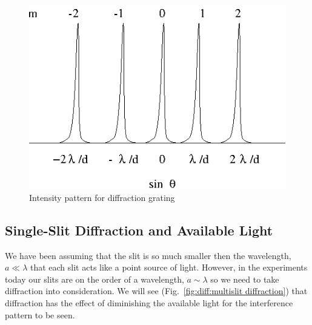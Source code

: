 \begin{figure}[htb]
\centering 
\epsfxsize=6cm \includegraphics[scale=0.6]{10_diffraction/diffractI.eps}
\caption{Intensity pattern for diffraction grating}
\label{fig:diff:diffgratI}
\end{figure}

\subsection{Single-Slit Diffraction and Available Light}
\label{sec:diff:singleslit}

We have been assuming that the slit is so much smaller then the wavelength,
$a \ll \lambda$ that each slit acts like a point source of light.  However,
in the experiments today our slits are on the order of a wavelength, 
$a \sim \lambda$ so we need to take diffraction into consideration.
We will see (Fig.~\ref{fig:diff:multislit diffraction}) that diffraction
has the effect of diminishing the available light for the interference pattern
to be seen.

